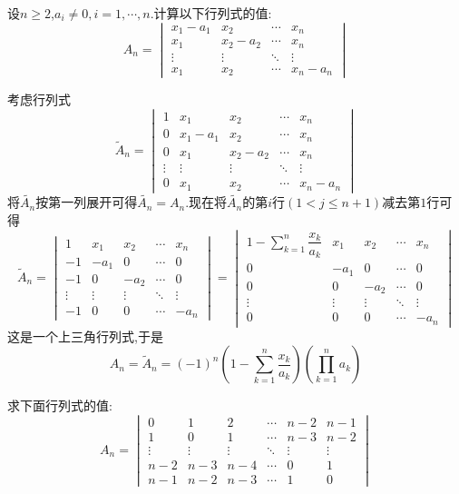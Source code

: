 \documentclass{ctexart}
\begin{document}
\begin{problem}
    设$n\geqslant2$,$a_i\neq0,i=1,\cdots,n$.计算以下行列式的值:
    \[A_n=\begin{vmatrix}
        x_1-a_1&x_2&\cdots&x_n\\
        x_1&x_2-a_2&\cdots&x_n\\
        \vdots&\vdots&\ddots&\vdots\\
        x_1&x_2&\cdots&x_n-a_n
    \end{vmatrix}\]
\end{problem}
\begin{solution}
    考虑行列式
    \[\tilde{A}_n=\begin{vmatrix}
        1&x_1&x_2&\cdots&x_n\\
        0&x_1-a_1&x_2&\cdots&x_n\\
        0&x_1&x_2-a_2&\cdots&x_n\\
        \vdots&\vdots&\vdots&\ddots&\vdots\\
        0&x_1&x_2&\cdots&x_n-a_n
    \end{vmatrix}\]
    将$\tilde{A_n}$按第一列展开可得$\tilde{A_n}=A_n$.现在将$\tilde{A_n}$的第$i$行$(1<j\leqslant n+1)$减去第$1$行可得
    \[\tilde{A}_n=\begin{vmatrix}
        1&x_1&x_2&\cdots&x_n\\
        -1&-a_1&0&\cdots&0\\
        -1&0&-a_2&\cdots&0\\
        \vdots&\vdots&\vdots&\ddots&\vdots\\
        -1&0&0&\cdots&-a_n
    \end{vmatrix}=\begin{vmatrix}
        \displaystyle1-\sum_{k=1}^{n}\dfrac{x_k}{a_k}&x_1&x_2&\cdots&x_n\\
        0&-a_1&0&\cdots&0\\
        0&0&-a_2&\cdots&0\\
        \vdots&\vdots&\vdots&\ddots&\vdots\\
        0&0&0&\cdots&-a_n
    \end{vmatrix}\]
    这是一个上三角行列式,于是
    \[A_n=\tilde{A}_n=(-1)^{n}\left(1-\sum_{k=1}^{n}\dfrac{x_k}{a_k}\right)\left(\prod_{k=1}^{n}a_k\right)\]
\end{solution}
\begin{problem}
    求下面行列式的值:
    \[A_n=\begin{vmatrix}
        0&1&2&\cdots&n-2&n-1\\
        1&0&1&\cdots&n-3&n-2\\
        \vdots&\vdots&\vdots&\ddots&\vdots&\vdots\\
        n-2&n-3&n-4&\cdots&0&1\\
        n-1&n-2&n-3&\cdots&1&0
    \end{vmatrix}\]
\end{problem}
\end{document}
